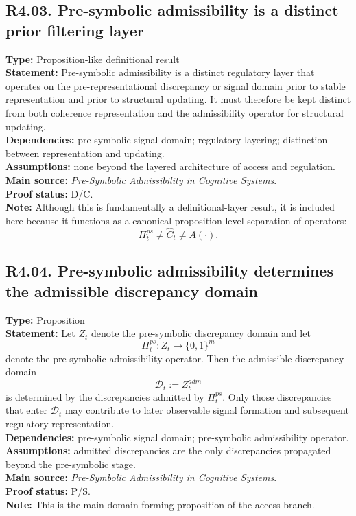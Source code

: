 \documentclass[12pt]{article}
\begin{document}
	\subsection*{R4.03. Pre-symbolic admissibility is a distinct prior filtering layer}
	\textbf{Type:} Proposition-like definitional result \\
	\textbf{Statement:} Pre-symbolic admissibility is a distinct regulatory layer that operates on
	the pre-representational discrepancy or signal domain prior to stable representation and prior
	to structural updating. It must therefore be kept distinct from both coherence representation
	and the admissibility operator for structural updating. \\
	\textbf{Dependencies:} pre-symbolic signal domain; regulatory layering; distinction between
	representation and updating. \\
	\textbf{Assumptions:} none beyond the layered architecture of access and regulation. \\
	\textbf{Main source:} \emph{Pre-Symbolic Admissibility in Cognitive Systems}. \\
	\textbf{Proof status:} D/C. \\
	\textbf{Note:} Although this is fundamentally a definitional-layer result, it is included here
	because it functions as a canonical proposition-level separation of operators:
	\[
	\Pi_t^{ps} \neq \widehat{C}_t \neq A(\cdot).
	\]
	
	\subsection*{R4.04. Pre-symbolic admissibility determines the admissible discrepancy domain}
	\textbf{Type:} Proposition \\
	\textbf{Statement:} Let $Z_t$ denote the pre-symbolic discrepancy domain and let
	\[
	\Pi_t^{ps}: Z_t \to \{0,1\}^m
	\]
	denote the pre-symbolic admissibility operator. Then the admissible discrepancy domain
	\[
	\mathcal{D}_t := Z_t^{adm}
	\]
	is determined by the discrepancies admitted by $\Pi_t^{ps}$. Only those discrepancies that
	enter $\mathcal{D}_t$ may contribute to later observable signal formation and subsequent regulatory
	representation. \\
	\textbf{Dependencies:} pre-symbolic signal domain; pre-symbolic admissibility operator. \\
	\textbf{Assumptions:} admitted discrepancies are the only discrepancies propagated beyond the
	pre-symbolic stage. \\
	\textbf{Main source:} \emph{Pre-Symbolic Admissibility in Cognitive Systems}. \\
	\textbf{Proof status:} P/S. \\
	\textbf{Note:} This is the main domain-forming proposition of the access branch.
	
\end{document}
